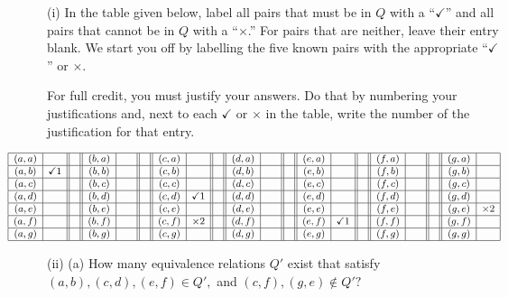 \documentclass[12pt]{article}
\begin{document}
	\medskip

	\par
	\noindent
	{(i)} In the table given below, label all pairs that must be in $Q$ with a ``$\checkmark$''
	and all pairs that cannot be in $Q$ with a ``$\times$.'' For pairs that are neither,
	leave their entry blank. We start you off by labelling the five known pairs with
	the appropriate ``$\checkmark$'' or $\times.$

	\smallskip

	For full credit, you must justify your answers. Do that by numbering your justifications
	and, next to each $\checkmark$ or $\times$ in the table, write the number of the
	justification for that entry.

	\[
		\small \hspace*{-.5in}
		\begin{array}{|c|c||c||c|c||c||c|c||c||c|c||c||c|c||c|| c|c|| c|| c| c|}
			\hline
			(a,a) & \quad        &  & (b,a) & \quad &  & (c,a) & \quad        &  & (d,a) & \quad &  & (e,a) & \quad        &  & (f,a) & \quad &  & (g,a) & \quad    \\
			\hline
			(a,b) & \checkmark 1 &  & (b,b) &       &  & (c,b) &              &  & (d,b) &       &  & (e,b) &              &  & (f,b) &       &  & (g,b) &          \\
			\hline
			(a,c) & \quad        &  & (b,c) & \quad &  & (c,c) & \quad        &  & (d,c) & \quad &  & (e,c) & \quad        &  & (f,c) & \quad &  & (g,c) & \quad    \\
			\hline
			(a,d) &              &  & (b,d) &       &  & (c,d) & \checkmark 1 &  & (d,d) &       &  & (e,d) &              &  & (f,d) &       &  & (g,d) &          \\
			\hline
			(a,e) &              &  & (b,e) &       &  & (c,e) &              &  & (d,e) &       &  & (e,e) &              &  & (f,e) &       &  & (g,e) & \times 2 \\
			\hline
			(a,f) &              &  & (b,f) &       &  & (c,f) & \times 2     &  & (d,f) &       &  & (e,f) & \checkmark 1 &  & (f,f) &       &  & (g,f) &          \\
			\hline
			(a,g) &              &  & (b,g) &       &  & (c,g) &              &  & (d,g) &       &  & (e,g) &              &  & (f,g) &       &  & (g,g) &          \\
			\hline
		\end{array}
	\]
	\bigskip

	\bigskip

	\par
	\noindent
	{(ii)} (a) How many equivalence relations $Q'$ exist that satisfy $(a,b), (c,d)
	,(e,f)\in Q',$ and $(c,f), (g,e) \not \in Q'?$
\end{document}
